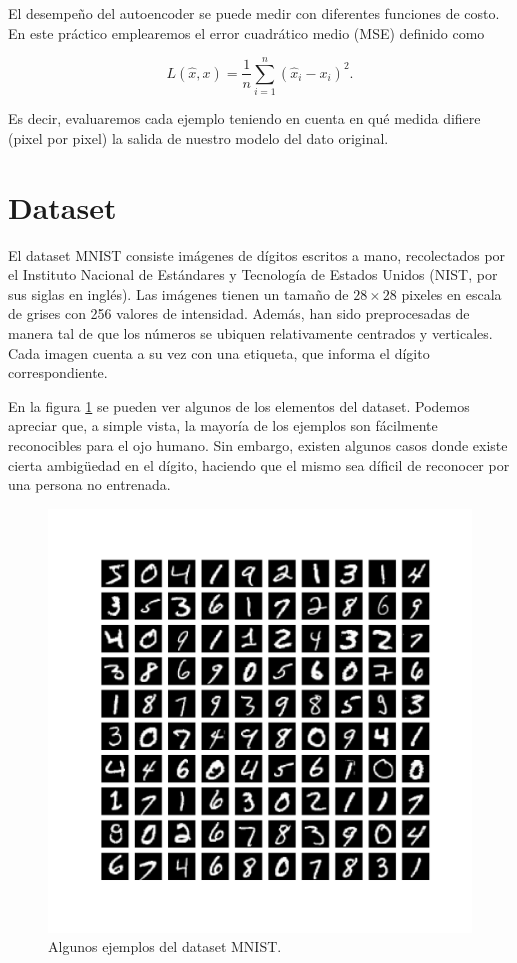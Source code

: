 \documentclass[10pt,twocolumn]{article}
\begin{document}
El desempeño del autoencoder se puede medir con diferentes funciones de costo. En este práctico emplearemos el error cuadrático medio (MSE) definido como

\begin{equation}
L(\hat{x}, x) = \dfrac{1}{n} \sum_{i=1}^n (\hat{x}_i - x_i)^2.
\end{equation}

Es decir, evaluaremos cada ejemplo teniendo en cuenta en qué medida difiere (pixel por pixel) la salida de nuestro modelo del dato original.

\section{Dataset}

El dataset MNIST \cite{LeCun} consiste imágenes de dígitos escritos a mano, recolectados por el Instituto Nacional de Estándares y Tecnología de Estados Unidos (NIST, por sus siglas en inglés). Las imágenes tienen un tamaño de $28\times28$ pixeles en escala de grises con 256 valores de intensidad. Además, han sido preprocesadas de manera tal de que los números se ubiquen relativamente centrados y verticales. Cada imagen cuenta a su vez con una etiqueta, que informa el dígito correspondiente. 

En la figura \ref{fig:ejemplos} se pueden ver algunos de los elementos del dataset. Podemos apreciar que, a simple vista, la mayoría de los ejemplos son fácilmente reconocibles para el ojo humano. Sin embargo, existen algunos casos donde existe cierta ambigüedad en el dígito, haciendo que el mismo sea díficil de reconocer por una persona no entrenada. 


\begin{figure}[th]
\centering
\includegraphics[scale=0.45]{ejemplos.pdf}
\caption{\label{fig:ejemplos} Algunos ejemplos del dataset MNIST.}
\end{figure}
\end{document}
